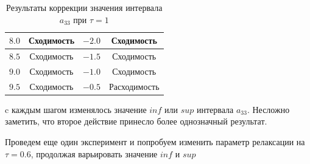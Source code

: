 \documentclass[../body.tex]{subfiles}
\begin{document}
\begin{table}[H]
\begin{tabular}{|c|c|c|c|}
				\hline
				$8.0$ & Сходимость & $-2.0$ & Сходимость \\
				
				\hline
				$8.5$ & Сходимость & $-1.5$ & Сходимость \\
				
				\hline
				$9.0$ & Сходимость & $-1.0$ & Сходимость \\
				
				\hline
				$9.5$ & Сходимость & $-0.5$ & Расходимость \\

				\hline
				
			\end{tabular}
			\caption{Результаты коррекции значения интервала $a_{33}$ при $\tau=1$}
		\end{table}
		
c каждым шагом изменялось значение $inf$ или $sup$ интервала $a_{33}$.
Несложно заметить, что второе действие принесло более однозначный результат.

Проведем еще один эксперимент и попробуем изменить параметр релаксации на $\tau=0.6$, продолжая варьировать значение $inf$ и $sup$
\end{document}

